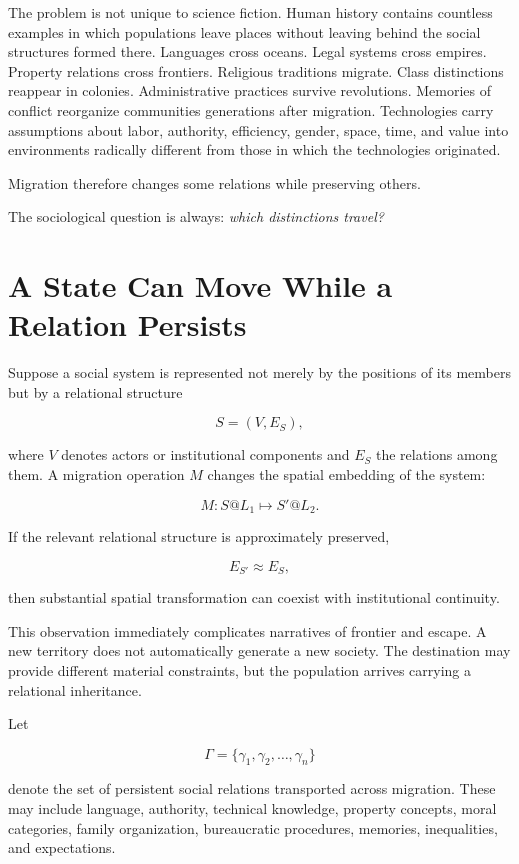 \documentclass[11pt,oneside]{book}
\theoremstyle{definition}
\theoremstyle{remark}
\begin{document}
The problem is not unique to science fiction. Human history contains countless examples in which populations leave places without leaving behind the social structures formed there. Languages cross oceans. Legal systems cross empires. Property relations cross frontiers. Religious traditions migrate. Class distinctions reappear in colonies. Administrative practices survive revolutions. Memories of conflict reorganize communities generations after migration. Technologies carry assumptions about labor, authority, efficiency, gender, space, time, and value into environments radically different from those in which the technologies originated.

Migration therefore changes some relations while preserving others.

The sociological question is always: \emph{which distinctions travel?}

\section{A State Can Move While a Relation Persists}

Suppose a social system is represented not merely by the positions of its members but by a relational structure

\[
S=(V,E_S),
\]

where \(V\) denotes actors or institutional components and \(E_S\) the relations among them. A migration operation \(M\) changes the spatial embedding of the system:

\[
M:S@L_1\mapsto S'@L_2.
\]

If the relevant relational structure is approximately preserved,

\[
E_{S'}\approx E_S,
\]

then substantial spatial transformation can coexist with institutional continuity.

This observation immediately complicates narratives of frontier and escape. A new territory does not automatically generate a new society. The destination may provide different material constraints, but the population arrives carrying a relational inheritance.

Let

\[
\Gamma
=
\{
\gamma_1,\gamma_2,\ldots,\gamma_n
\}
\]

denote the set of persistent social relations transported across migration. These may include language, authority, technical knowledge, property concepts, moral categories, family organization, bureaucratic procedures, memories, inequalities, and expectations.
\end{document}
